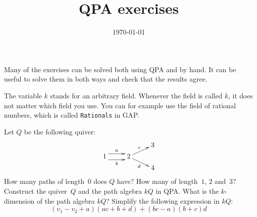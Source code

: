 \documentclass[a4paper]{amsart}
\begin{document}
\title{QPA exercises}

\date{\today}

\maketitle

Many of the exercises can be solved both using QPA and by hand.  It
can be useful to solve them in both ways and check that the results
agree.

The variable $k$ stands for an arbitrary field.  Whenever the field is
called $k$, it does not matter which field you use.  You can for
example use the field of rational numbers, which is called
\texttt{Rationals} in GAP.

\begin{Exercise}[title={Paths and algebra elements}]
Let $Q$ be the following quiver:
\[
\xymatrix@R=1ex{
&& 3 \\
1 \ar@<1ex>[r]^a \ar@<-1ex>[r]_b &
2 \ar[ur]^c \ar[dr]_d \\
&& 4
}
\]
\Question How many paths of length~$0$ does $Q$ have?  How many of
length~$1$, $2$ and~$3$?
\Question Construct the quiver~$Q$ and the path algebra $kQ$ in QPA.
\Question What is the $k$-dimension of the path algebra $kQ$?
\Question Simplify the following expression in $kQ$:
\[
(v_1 - v_2 + a)(ac + b + d) + (bc - a)(b + c)d
\]
\end{Exercise}
\end{document}
